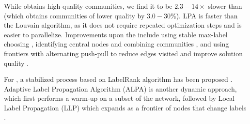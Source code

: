 While \Lou{} obtains high-quality communities, we find it to be $2.3 - 14\times$ slower than \LPA{} (which obtains communities of lower quality by $3.0 - 30\%$). LPA is faster than the Louvain algorithm, as it does not require repeated optimization steps and is easier to parallelize. Improvements upon the \LPA{} include using stable max-label choosing \cite{com-xing14}, identifying central nodes and combining communities \cite{com-you20}, and using frontiers with alternating push-pull to reduce edges visited and improve solution quality \cite{com-liu20}.

For \LPA{}, a stabilized process based on LabelRank algorithm has been proposed \cite{com-xie13}. Adaptive Label Propagation Algorithm (ALPA) is another dynamic approach, which first performs a warm-up \LPA{} on a subset of the network, followed by Local Label Propagation (LLP) which expands as a frontier of nodes that change labels \cite{com-han17}. 



